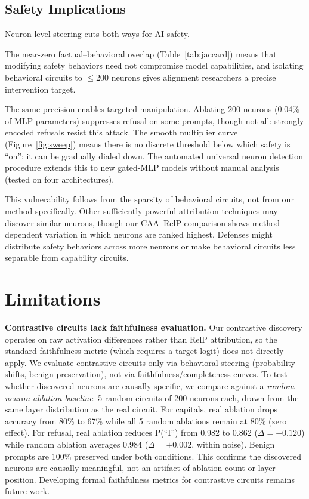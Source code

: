 \documentclass[11pt]{article}
\begin{document}
\subsection{Safety Implications}

Neuron-level steering cuts both ways for AI safety.

The near-zero factual--behavioral overlap (Table~\ref{tab:jaccard}) means that modifying safety behaviors need not compromise model capabilities, and isolating behavioral circuits to $\leq$200 neurons gives alignment researchers a precise intervention target.

The same precision enables targeted manipulation.
Ablating 200 neurons (0.04\% of MLP parameters) suppresses refusal on some prompts, though not all: strongly encoded refusals resist this attack.
The smooth multiplier curve (Figure~\ref{fig:sweep}) means there is no discrete threshold below which safety is ``on''; it can be gradually dialed down.
The automated universal neuron detection procedure extends this to new gated-MLP models without manual analysis (tested on four architectures).

This vulnerability follows from the sparsity of behavioral circuits, not from our method specifically.
Other sufficiently powerful attribution techniques may discover similar neurons, though our CAA--RelP comparison shows method-dependent variation in which neurons are ranked highest.
Defenses might distribute safety behaviors across more neurons or make behavioral circuits less separable from capability circuits.


\section{Limitations}
\label{sec:limitations}

\textbf{Contrastive circuits lack faithfulness evaluation.}
Our contrastive discovery operates on raw activation differences rather than RelP attribution, so the standard faithfulness metric (which requires a target logit) does not directly apply.
We evaluate contrastive circuits only via behavioral steering (probability shifts, benign preservation), not via faithfulness/completeness curves.
To test whether discovered neurons are causally specific, we compare against a \emph{random neuron ablation baseline}: 5 random circuits of 200 neurons each, drawn from the same layer distribution as the real circuit.
For capitals, real ablation drops accuracy from 80\% to 67\% while all 5 random ablations remain at 80\% (zero effect).
For refusal, real ablation reduces P(``I'') from 0.982 to 0.862 ($\Delta = -0.120$) while random ablation averages 0.984 ($\Delta = +0.002$, within noise).
Benign prompts are 100\% preserved under both conditions.
This confirms the discovered neurons are causally meaningful, not an artifact of ablation count or layer position.
Developing formal faithfulness metrics for contrastive circuits remains future work.
\end{document}
